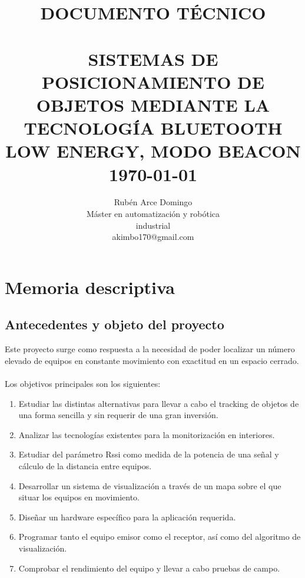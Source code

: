 \documentclass[paper=a4, fontsize=11pt,twoside]{scrartcl}	%
\title{	\normalsize \textsc{DOCUMENTO TÉCNICO} 	%
		 	\\[2.0cm]								%
             \HRule{0.5pt} \\						%
             \LARGE \textbf{\uppercase{Sistemas de posicionamiento de objetos mediante la tecnología Bluetooth Low Energy, modo Beacon}}	%
			\HRule{2pt} \\ [0.5cm]		%
			\normalsize \today			%
		}
\author{
    Rubén Arce Domingo\\	
		Máster en automatización y robótica\\	
        industrial\\
        akimbo170@gmail.com\\
}
\makeatletter
\def\printtitle{%
{\centering \@title\par}}
\def\printauthor{%
{\centering \large \@author}}
\makeatother
\begin{document}
\thispagestyle{empty}		%
\printtitle					%
  	\vfill
\printauthor				%
\newpage


\cleardoublepage
\tableofcontents
\listoffigures
\cleardoublepage
\pagestyle{fancy}




\section{Memoria descriptiva}
    \subsection{Antecedentes y objeto del proyecto}
        Este proyecto surge como respuesta a la necesidad de poder localizar un número elevado de equipos en 
        constante movimiento con exactitud en un espacio cerrado.
        \paragraph{}
       Los objetivos principales son los siguientes:
        \begin{enumerate}
            \item Estudiar las distintas alternativas para llevar a cabo el tracking de objetos de una forma
            sencilla y sin requerir de una gran inversión.
            \item Analizar las tecnologías existentes para la monitorización en interiores.
            \item Estudiar del parámetro Rssi como medida de la potencia de una señal y cálculo de la distancia entre equipos.
            \item Desarrollar un sistema de visualización a través de un mapa sobre el que situar los equipos en movimiento.
            \item Diseñar un hardware específico para la aplicación requerida.
            \item Programar tanto el equipo emisor como el receptor, así como del algoritmo de visualización.
            \item Comprobar el rendimiento del equipo y llevar a cabo pruebas de campo. 
        \end{enumerate}
\end{document}
